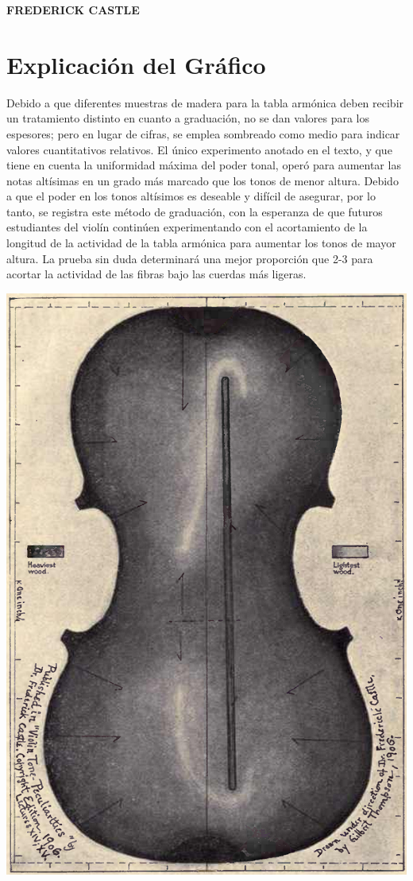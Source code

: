 \documentclass[12pt]{book}
\begin{document}
\begin{flushright}
\textbf{FREDERICK CASTLE}
\end{flushright}

\chapter*{Explicación del Gráfico}

Debido a que diferentes muestras de madera para la tabla armónica deben recibir un tratamiento distinto en cuanto a graduación, no se dan valores para los espesores; pero en lugar de cifras, se emplea sombreado como medio para indicar valores cuantitativos relativos. El único experimento anotado en el texto, y que tiene en cuenta la uniformidad máxima del poder tonal, operó para aumentar las notas altísimas en un grado más marcado que los tonos de menor altura. Debido a que el poder en los tonos altísimos es deseable y difícil de asegurar, por lo tanto, se registra este método de graduación, con la esperanza de que futuros estudiantes del violín continúen experimentando con el acortamiento de la longitud de la actividad de la tabla armónica para aumentar los tonos de mayor altura. La prueba sin duda determinará una mejor proporción que 2-3 para acortar la actividad de las fibras bajo las cuerdas más ligeras.

\begin{center}
\includegraphics[width=1\textwidth]{./img/grafico.png} %
\end{center}
\end{document}
